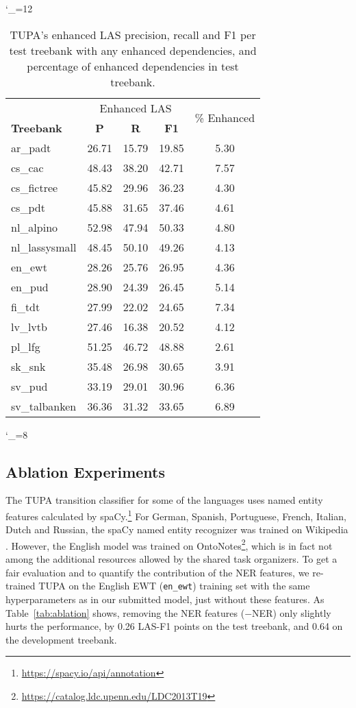 \documentclass[11pt,a4paper]{article}
\begin{document}
\catcode`\_=12
\begin{table}[t]
\begin{tabular}{l|ccc|c}
\hline
& \multicolumn{3}{c|}{Enhanced LAS} & \multirow{2}{11mm}{\% Enhanced} \\
\bf Treebank & \bf P & \bf R & \bf F1 & \\
\hline
ar_padt & 26.71 & 15.79 & 19.85 & 5.30\\
cs_cac & 48.43 & 38.20 & 42.71 & 7.57\\
cs_fictree & 45.82 & 29.96 & 36.23 & 4.30\\
cs_pdt & 45.88 & 31.65 & 37.46 & 4.61\\
nl_alpino & 52.98 & 47.94 & 50.33 & 4.80\\
nl_lassysmall & 48.45 & 50.10 & 49.26 & 4.13\\
en_ewt & 28.26 & 25.76 & 26.95 & 4.36\\
en_pud & 28.90 & 24.39 & 26.45 & 5.14\\
fi_tdt & 27.99 & 22.02 & 24.65 & 7.34\\
lv_lvtb & 27.46 & 16.38 & 20.52 & 4.12\\
pl_lfg & 51.25 & 46.72 & 48.88 & 2.61\\
sk_snk & 35.48 & 26.98 & 30.65 & 3.91\\
sv_pud & 33.19 & 29.01 & 30.96 & 6.36\\
sv_talbanken & 36.36 & 31.32 & 33.65 & 6.89
\end{tabular}
\caption{TUPA's enhanced LAS precision, recall and F1 per test treebank with 
any enhanced dependencies,
and percentage of enhanced dependencies in test treebank.
\label{tab:enhanced}}
\end{table}
\catcode`\_=8

\subsection{Ablation Experiments}\label{sec:ablation}

The TUPA transition classifier for some of the languages uses
named entity features calculated by
spaCy.\footnote{\url{https://spacy.io/api/annotation}}
For German, Spanish, Portuguese, French, Italian, Dutch and Russian,
the spaCy named entity recognizer was trained
on Wikipedia \cite{nothman2013learning}.
However, the English model was trained on
OntoNotes\footnote{\url{https://catalog.ldc.upenn.edu/LDC2013T19}},
which is in fact not among the additional resources allowed by the shared task
organizers.
To get a fair evaluation
and to quantify the contribution of the NER features,
we re-trained TUPA on the English EWT (\verb|en_ewt|) training set
with the same hyperparameters as in our submitted model,
just without these features.
As Table~\ref{tab:ablation} shows,
removing the NER features ($-$NER) only slightly hurts the performance,
by 0.26 LAS-F1 points on the test treebank,
and 0.64 on the development treebank. 
\end{document}
